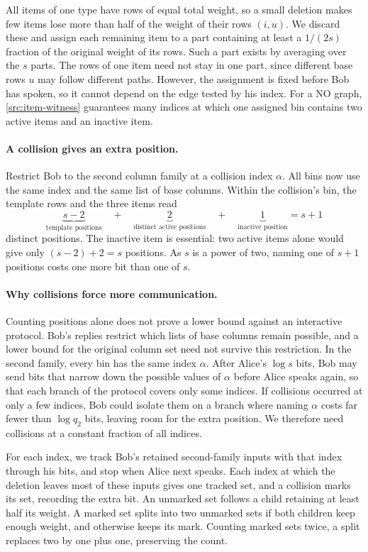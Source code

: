 \documentclass[11pt,letterpaper]{article} \usepackage[utf8]{inputenc}
\theoremstyle{plain} \newtheorem{theorem}{Theorem}[section]
\theoremstyle{definition} \newaliascnt{definition}{theorem}
\begin{document}
All items of one type have rows of equal total weight, so a small deletion
makes few items lose more than half of the weight of their rows $(i,u)$. We discard these and assign each remaining item to a part containing at least a
$1/(2s)$ fraction of the original weight of its rows. Such a part exists by
averaging over the $s$ parts. The rows of one item need not stay in one part,
since different base rows $u$ may follow different paths. However, the
assignment is fixed before Bob has spoken, so it cannot depend on
the edge tested by his index. For a NO graph, \cref{src:item-witness} guarantees many indices
at which one assigned bin contains two active items and an inactive item.

\paragraph{A collision gives an extra position.}
Restrict Bob to the second column family at a collision index $\alpha$.
All bins now use the same index and the same list of base columns.
Within the collision's bin, the template rows and the three items read
\[
\underbrace{s-2}_{\text{template positions}}
\quad+\quad
\underbrace{2}_{\text{distinct active positions}}
\quad+\quad
\underbrace{1}_{\text{inactive position}}
=s+1
\]
distinct positions. The inactive item is essential: two active items
alone would give only $(s-2)+2=s$ positions. As $s$ is a power of two,
naming one of $s+1$ positions costs one more bit than one of $s$.

\paragraph{Why collisions force more communication.}
Counting positions alone does not prove a lower bound against an
interactive protocol. Bob's replies restrict which lists of base columns remain possible, and a lower
bound for the original column set need not survive this restriction.
In the second family, every bin has the same
index $\alpha$. After Alice's $\log s$ bits, Bob may send bits
that narrow down the possible values of $\alpha$ before Alice speaks again,
so that each branch of the protocol covers only some indices. If
collisions occurred at only a few indices, Bob could isolate them on a
branch where naming $\alpha$ costs far fewer than $\log q_2$ bits, leaving
room for the extra position. We therefore need collisions at a constant
fraction of all indices.

For each index, we track Bob's retained second-family inputs with that
index through his bits, and stop when Alice next speaks. Each index at which the deletion leaves most of these inputs gives one
tracked set, and a collision marks its set,
recording the extra bit. An unmarked set follows a child retaining at
least half its weight. A marked set splits into two unmarked sets if both
children keep enough weight, and otherwise keeps its mark. Counting marked
sets twice, a split replaces two by one plus one, preserving the count.
\end{document}
